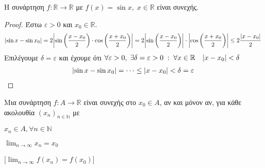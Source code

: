 \documentclass[a4paper,table]{report}
\begin{document}
\begin{prop}
  Η συνάρτηση $ f \colon \mathbb{R} \to \mathbb{R} $ με $ f(x)= \sin{x}, \; x \in 
  \mathbb{R}$ είναι συνεχής.
\end{prop}
\begin{proof}
\item {}
  Έστω $ \varepsilon >0 $ και $ x_{0} \in \mathbb{R} $. 
  \[
    \abs{\sin{x} - \sin{x_{0}}} = 2 \abs{\sin{\left(\frac{x - x_{0}}{2}\right)} 
    \cdot \cos{\left(\frac{x+ x_{0}}{2}\right)}} = 2 
    \abs{\sin{\left(\frac{x- x_{0}}{2}\right)}} \cdot 
    \abs{\cos{\left(\frac{x+ x_{0}}{2}\right)}} \leq 2 \frac{\abs{x- x_{0}}}{2}
  \]
  Επιλέγουμε $ \delta = \varepsilon $ και έχουμε ότι $ \forall \varepsilon >0, \; 
  \exists \delta = \varepsilon > 0 \; : \; \forall x \in \mathbb{R} \quad 
  \abs{x- x_{0}} < \delta $
  \begin{align*}
    \abs{\sin{x} - \sin{x_{0}}} = \cdots \leq \abs{x - x_{0}} < \delta = 
    \varepsilon  
  \end{align*} 
\end{proof}

\begin{thm}
  Μια συνάρτηση $ f \colon A \to \mathbb{R} $ είναι συνεχής στο $ x_{0} \in A $, 
  αν και μόνον αν, για κάθε ακολουθία $ {(x_{n})}_{n \in \mathbb{N}} $ με

  \vspace{\baselineskip}

  \begin{minipage}{0.25\textwidth}
    \begin{myitemize}
      \item $ x_{n} \in A, \forall n \in \mathbb{N} $ \hfill {}
      \item $ \lim_{n \to \infty} x_{n} = x_{0} $ \hfill {}
    \end{myitemize}
  \end{minipage}
  [$ \lim_{n \to \infty} f(x_{n}) = f(x_{0}) $]
\end{thm}
\end{document}
